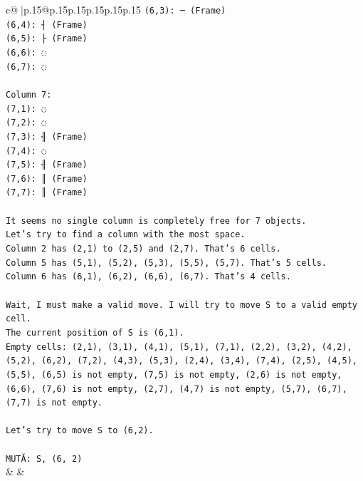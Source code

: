 \documentclass{article}
\begin{document}
{\begin{supertabular}{c@{$\;$}|p{.15\linewidth}@{}p{.15\linewidth}p{.15\linewidth}p{.15\linewidth}p{.15\linewidth}p{.15\linewidth}}
{{{\texttt{(6,3): ─ (Frame)} \\
\texttt{(6,4): ┤ (Frame)} \\
\texttt{(6,5): ├ (Frame)} \\
\texttt{(6,6): ◌} \\
\texttt{(6,7): ◌} \\
\\ 
\texttt{Column 7:} \\
\texttt{(7,1): ◌} \\
\texttt{(7,2): ◌} \\
\texttt{(7,3): ╢ (Frame)} \\
\texttt{(7,4): ◌} \\
\texttt{(7,5): ╢ (Frame)} \\
\texttt{(7,6): ║ (Frame)} \\
\texttt{(7,7): ║ (Frame)} \\
\\ 
\texttt{It seems no single column is completely free for 7 objects.} \\
\texttt{Let's try to find a column with the most space.} \\
\texttt{Column 2 has (2,1) to (2,5) and (2,7). That's 6 cells.} \\
\texttt{Column 5 has (5,1), (5,2), (5,3), (5,5), (5,7). That's 5 cells.} \\
\texttt{Column 6 has (6,1), (6,2), (6,6), (6,7). That's 4 cells.} \\
\\ 
\texttt{Wait, I must make a valid move. I will try to move S to a valid empty cell.} \\
\texttt{The current position of S is (6,1).} \\
\texttt{Empty cells: (2,1), (3,1), (4,1), (5,1), (7,1), (2,2), (3,2), (4,2), (5,2), (6,2), (7,2), (4,3), (5,3), (2,4), (3,4), (7,4), (2,5), (4,5), (5,5), (6,5) is not empty, (7,5) is not empty, (2,6) is not empty, (6,6), (7,6) is not empty, (2,7), (4,7) is not empty, (5,7), (6,7), (7,7) is not empty.} \\
\\ 
\texttt{Let's try to move S to (6,2).} \\
\\ 
\texttt{MUTĂ: S, (6, 2)} \\
            }
        }
    }
    & & \\ \\


\end{supertabular}}
\end{document}
